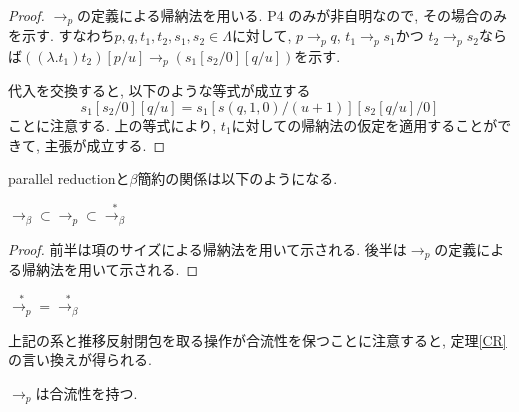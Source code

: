\documentclass[12pt, titlepage]{ltjsarticle}
\begin{document}
\begin{proof}
 $\rightarrow_{p}$の定義による帰納法を用いる. P4%
のみが非自明なので, その場合のみを示す.
 すなわち$p, q, t_1, t_2, s_1, s_2 \in \Lambda$に対して,
$p \rightarrow_{p} q$, $t_1 \rightarrow_{p} s_1$かつ $t_2 \rightarrow_{p} s_2$ならば$((\lambda. t_1) t_2) [p / u] \rightarrow_{p} (s_1 [s_2 / 0] [q / u])$を示す.
 
 代入を交換すると, 以下のような等式が成立する
 \[
 s_1 [s_2 / 0][q / u] = s_1 [s(q, 1, 0) / (u + 1)][s_2 [q / u] / 0]
 \]
 ことに注意する. 上の等式により, $t_1$に対しての帰納法の仮定を適用することができて, 主張が成立する.
\end{proof}

parallel reductionと$\beta$簡約の関係は以下のようになる.

\begin{lem}
 $\rightarrow_{\beta} \subset \rightarrow_{p} \subset \overset{*}{\rightarrow_{\beta}}$
\end{lem}

\begin{proof}
 前半は項のサイズによる帰納法を用いて示される. 後半は$\rightarrow_{p}$の定義による帰納法を用いて示される.
\end{proof}

\begin{cor}
 $\overset{*}{\rightarrow_{p}} = \overset{*}{\rightarrow_{\beta}}$
\end{cor}

上記の系と推移反射閉包を取る操作が合流性を保つことに注意すると, 定理\ref{CR}の言い換えが得られる.

\begin{thm}\label{CR'}
 $\rightarrow_{p}$は合流性を持つ.
\end{thm}
\end{document}
